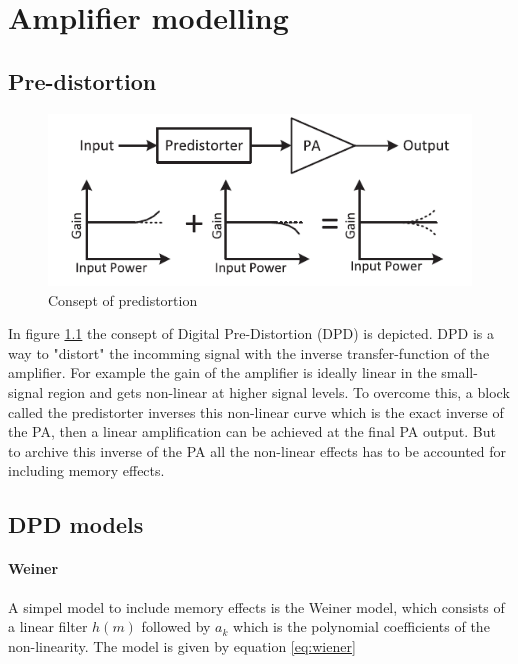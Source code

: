 \chapter{Amplifier modelling}

\section{Pre-distortion}

\begin{figure}[H]
\centering 
\includegraphics[scale = 0.7]{figures/ch1/predistortion_consept.png}
\caption{Consept of predistortion \citep{guo2015}}
\label{fig:pre_cons}
\end{figure}

In figure \ref{fig:pre_cons} the consept of Digital Pre-Distortion (DPD) is depicted. DPD is a way to "distort" the incomming signal with the inverse transfer-function of the amplifier. For example the gain of the amplifier is ideally linear in the small-signal region and gets non-linear at higher signal levels. To overcome this, a block called the predistorter inverses this non-linear curve which is the exact inverse of the PA, then a linear amplification can be achieved at the final PA output. But to archive this inverse of the PA all the non-linear effects has to be accounted for including memory effects. 

\section{DPD models}


\subsubsection{Weiner}
A simpel model to include memory effects is the Weiner model, which consists of a linear filter $h(m)$ followed by $a_k$ which is the polynomial coefficients of the non-linearity. The model is given by equation \ref{eq:wiener}

